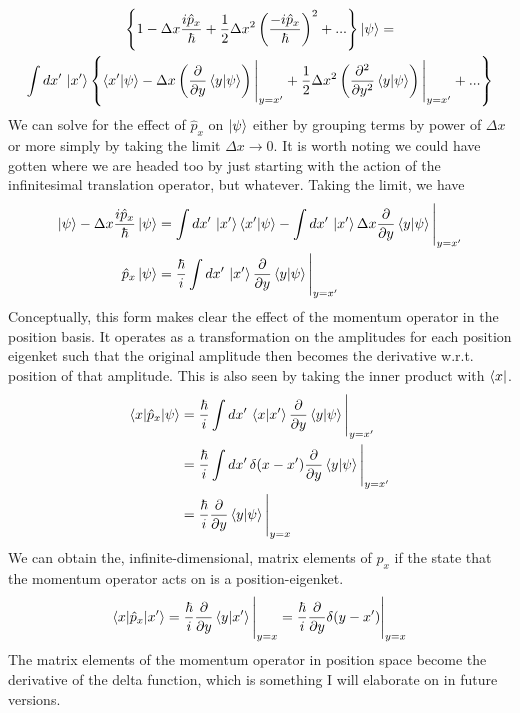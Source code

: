 \documentclass[12pt]{article}
\numberwithin{equation}{section}
\begin{document}
\begin{multline}
    \left\{1 - \Delta x \frac{i\hat{p}_x}{\hbar} + \frac{1}{2}\Delta x^2 \left(\frac{-i\hat{p}_x}{\hbar}\right)^2 + ... \right\}\ket{\psi} = \\ \int dx' \, \ket{x'} \left\{\braket{x' | \psi} - \Delta x \left(\frac{\partial}{\partial y}\braket{y | \psi}\right)\Bigg|_{y = x'} + \frac{1}{2}\Delta x^2 \left(\frac{\partial^2}{\partial y^2}\braket{y | \psi}\right)\Bigg|_{y = x'} + ...\right\}
    \label{translation_expansion}
\end{multline}
We can solve for the effect of $\hat{p}_x$ on $\ket{\psi}$ either by grouping terms by power of $\Delta x$ or more simply by taking the limit $\Delta x \rightarrow 0$. It is worth noting we could have gotten where we are headed too by just starting with the action of the infinitesimal translation operator, but whatever. Taking the limit, we have
\begin{align}
    \ket{\psi} - \Delta x \frac{i\hat{p}_x}{\hbar}\ket{\psi} &= \int dx' \, \ket{x'}\braket{x' | \psi} - \int dx' \, \ket{x'} \Delta x \frac{\partial}{\partial y}\braket{y | \psi}\Bigg|_{y = x'}\\
    \hat{p}_x \ket{\psi} &= \frac{\hbar}{i}\int dx' \, \ket{x'} \frac{\partial}{\partial y}\braket{y | \psi}\Bigg|_{y = x'}\\
\end{align}
Conceptually, this form makes clear the effect of the momentum operator in the position basis. It operates as a transformation on the amplitudes for each position eigenket such that the original amplitude then becomes the derivative w.r.t. position of that amplitude. This is also seen by taking the inner product with $\bra{x}$.
\begin{align}
    \braket{x | \hat{p}_x | \psi} &= \frac{\hbar}{i}\int dx' \, \braket{x | x'} \frac{\partial}{\partial y}\braket{y | \psi}\Bigg|_{y = x'}\\
    &= \frac{\hbar}{i}\int dx' \, \delta(x - x') \frac{\partial}{\partial y}\braket{y | \psi}\Bigg|_{y = x'}\\
    &= \frac{\hbar}{i} \frac{\partial}{\partial y}\braket{y | \psi}\Bigg|_{y = x}
\end{align}
We can obtain the, infinite-dimensional, matrix elements of $\hat{p}_x$ if the state that the momentum operator acts on is a position-eigenket.
\begin{equation}
    \braket{x | \hat{p}_x | x'} = \frac{\hbar}{i} \frac{\partial}{\partial y}\braket{y | x'}\Bigg|_{y = x} = \frac{\hbar}{i} \frac{\partial}{\partial y}\delta(y - x')\Bigg|_{y = x}
\end{equation}
The matrix elements of the momentum operator in position space become the derivative of the delta function, which is something I will elaborate on in future versions.
\end{document}
